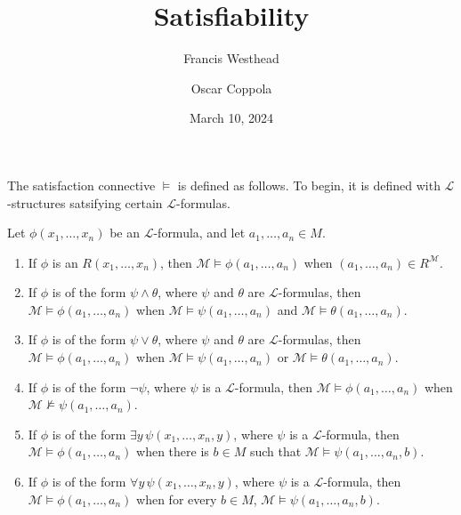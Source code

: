\documentclass[a4paper]{article}
\title{Satisfiability}
\date{March 10, 2024}
\author{Francis Westhead \and Oscar Coppola}
\begin{document}
\maketitle
\par{
    The satisfaction connective \(\vDash\) is defined as follows.
    To begin, it is defined with \(\mathcal  L\)-structures satsifying certain \(\mathcal  L\)-formulas.
}\par{
    Let \(\phi (x_1, \dots ,x_n)\) be an \(\mathcal  L\)-formula, and let \(a_1, \dots ,a_n \in  M\).
    \begin{enumerate}
\item{
            If \(\phi\) is an  \(R(x_1, \dots ,x_n)\),
            then \(\mathcal  M \vDash \phi (a_1, \dots ,a_n)\) when \((a_1, \dots ,a_n) \in  R^{ \mathcal  M}\).
        }
        \item{
            If \(\phi\) is of the form \(\psi \land \theta\), where \(\psi\) and \(\theta\)
            are \(\mathcal  L\)-formulas, then \(\mathcal  M \vDash \phi (a_1, \dots ,a_n)\)
            when \(\mathcal  M \vDash \psi (a_1, \dots ,a_n)\) and \(\mathcal  M \vDash \theta (a_1, \dots ,a_n)\).
        }
        \item{
            If \(\phi\) is of the form \(\psi \lor \theta\), where \(\psi\) and \(\theta\)
            are \(\mathcal  L\)-formulas, then \(\mathcal  M \vDash \phi (a_1, \dots ,a_n)\)
            when \(\mathcal  M \vDash \psi (a_1, \dots ,a_n)\) or \(\mathcal  M \vDash \theta (a_1, \dots ,a_n)\).
        }
        \item{
            If \(\phi\) is of the form \(\neg \psi\), where \(\psi\) is a \(\mathcal  L\)-formula,
            then \(\mathcal  M \vDash \phi (a_1, \dots ,a_n)\) when \(\mathcal  M \not \vDash \psi (a_1, \dots ,a_n)\).
        }
        \item{
            If \(\phi\) is of the form \(\exists  y \, \psi (x_1, \dots ,x_n,y)\),
            where \(\psi\) is a \(\mathcal  L\)-formula, then \(\mathcal  M \vDash \phi (a_1, \dots ,a_n)\)
            when there is \(b \in  M\) such that \(\mathcal  M \vDash \psi (a_1, \dots ,a_n,b)\).
        }
        \item{
            If \(\phi\) is of the form \(\forall  y \, \psi (x_1, \dots ,x_n,y)\),
            where \(\psi\) is a \(\mathcal  L\)-formula, then \(\mathcal  M \vDash \phi (a_1, \dots ,a_n)\)
            when for every \(b \in  M\), \(\mathcal  M \vDash \psi (a_1, \dots ,a_n,b)\).
        }
\end{enumerate}}\par{
}
\end{document}
